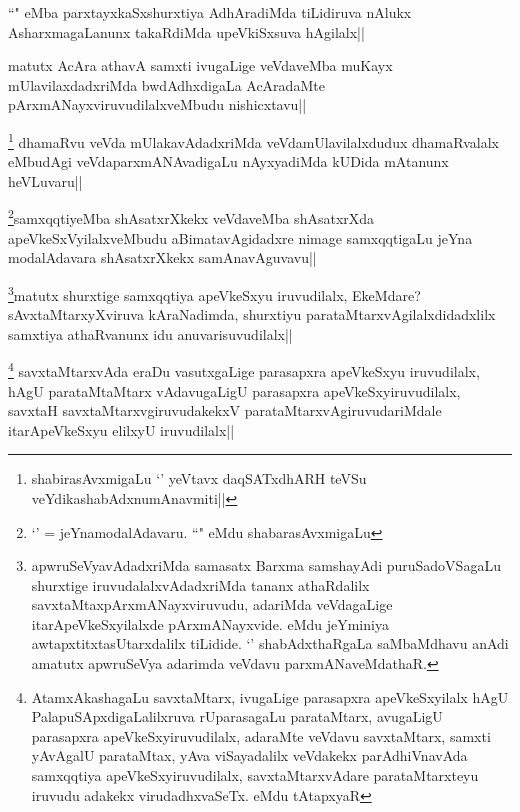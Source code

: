 
\begin{artha}
``\stext" eMba parxtayxkaSxshurxtiya AdhAradiMda tiLidiruva nAlukx AsharxmagaLanunx takaRdiMda upeVkiSxsuva hAgilalx||
\end{artha}

\begin{artha}
matutx AcAra athavA samxti ivugaLige veVdaveMba muKayx mUlavilaxdadxriMda bwdAdhxdigaLa AcAradaMte pArxmANayxviruvudilalxveMbudu nishicxtavu||
\end{artha}


\begin{artha}
\footnote{shabirasAvxmigaLu `\stext' yeVtavx daqSATxdhARH teVSu  veYdikashabAdxnumAnavmiti||} dhamaRvu veVda mUlakavAdadxriMda veVdamUlavilalxdudux dhamaRvalalx eMbudAgi veVdaparxmANAvadigaLu nAyxyadiMda kUDida mAtanunx heVLuvaru||
\end{artha}

\begin{artha}
\footnote{`\stext' = jeYnamodalAdavaru. ``\stext" eMdu shabarasAvxmigaLu}samxqqtiyeMba shAsatxrXkekx veVdaveMba shAsatxrXda apeVkeSxVyilalxveMbudu aBimatavAgidadxre nimage samxqqtigaLu jeYna modalAdavara shAsatxrXkekx samAnavAguvavu||
\end{artha}

\begin{artha}
\footnote{apwruSeVyavAdadxriMda samasatx Barxma samshayAdi puruSadoVSagaLu shurxtige iruvudalalxvAdadxriMda tananx athaRdalilx savxtaMtaxpArxmANayxviruvudu, adariMda veVdagaLige itarApeVkeSxyilalxde pArxmANayxvide. eMdu jeYminiya awtapxtitxtasUtarxdalilx tiLidide. `\stext' shabAdxthaRgaLa saMbaMdhavu anAdi amatutx apwruSeVya adarimda veVdavu parxmANaveMdathaR.}matutx shurxtige samxqqtiya apeVkeSxyu iruvudilalx, EkeMdare? sAvxtaMtarxyXviruva kAraNadimda, shurxtiyu parataMtarxvAgilalxdidadxlilx samxtiya athaRvanunx idu anuvarisuvudilalx||
\end{artha}

\begin{artha}
\footnote{AtamxAkashagaLu savxtaMtarx, ivugaLige parasapxra apeVkeSxyilalx hAgU PalapuSApxdigaLalilxruva rUparasagaLu parataMtarx, avugaLigU parasapxra apeVkeSxyiruvudilalx, adaraMte veVdavu savxtaMtarx, samxti yAvAgalU parataMtax, yAva viSayadalilx veVdakekx parAdhiVnavAda samxqqtiya apeVkeSxyiruvudilalx, savxtaMtarxvAdare parataMtarxteyu iruvudu adakekx virudadhxvaSeTx. eMdu tAtapxyaR} savxtaMtarxvAda eraDu vasutxgaLige parasapxra apeVkeSxyu iruvudilalx, hAgU parataMtaMtarx vAdavugaLigU parasapxra apeVkeSxyiruvudilalx, savxtaH savxtaMtarxvgiruvudakekxV parataMtarxvAgiruvudariMdale itarApeVkeSxyu elilxyU iruvudilalx||
\end{artha}

